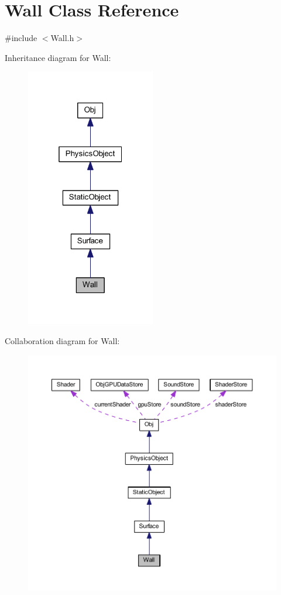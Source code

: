 \hypertarget{class_wall}{}\section{Wall Class Reference}
\label{class_wall}


{\ttfamily \#include $<$Wall.\+h$>$}



Inheritance diagram for Wall\+:
\nopagebreak
\begin{figure}[H]
\begin{center}
\leavevmode
\includegraphics[width=160pt]{class_wall__inherit__graph}
\end{center}
\end{figure}


Collaboration diagram for Wall\+:
\nopagebreak
\begin{figure}[H]
\begin{center}
\leavevmode
\includegraphics[width=350pt]{class_wall__coll__graph}
\end{center}
\end{figure}
